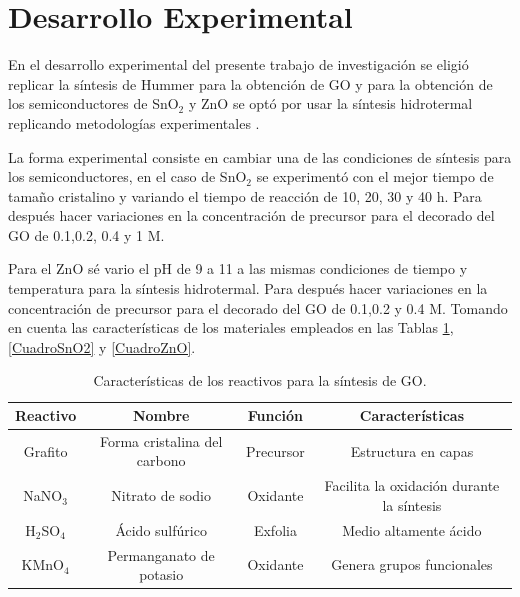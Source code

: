 \documentclass[12pt]{article}
\begin{document}
\newpage
\section{Desarrollo Experimental}
En el desarrollo experimental del presente trabajo de investigación se eligió replicar la síntesis de Hummer para la obtención de GO y para la obtención de los semiconductores de SnO$\displaystyle _{2}$ y ZnO se optó por usar la síntesis hidrotermal replicando metodologías experimentales \cite{IEEEreferencias:Ref36}.\vspace{1em} %

La forma experimental consiste en cambiar una de las condiciones de síntesis para los semiconductores, en el caso de SnO$\displaystyle _{2}$ se experimentó con el mejor tiempo de tamaño cristalino y variando el tiempo de reacción de 10, 20, 30 y 40 h. Para después hacer variaciones en la concentración de precursor para el decorado del GO de 0.1,0.2, 0.4 y 1 M.\vspace{1em} %

Para el ZnO sé vario el pH de 9 a 11 a las mismas condiciones de tiempo y temperatura para la síntesis hidrotermal. Para después hacer variaciones en la concentración de precursor para el decorado del GO de 0.1,0.2 y 0.4 M. Tomando en cuenta las características de los materiales empleados en las Tablas \ref{CuadroGO}, \ref{CuadroSnO2} y \ref{CuadroZnO}.\vspace{1em} %
\begin{table}[h]
\centering
\caption{Características de los reactivos para la síntesis de GO.}
\begin{tabular}{|c|c|c|c|}
\hline
\textbf{Reactivo} & \textbf{Nombre} & \textbf{Función} & \textbf{Características} \\ 
\hline
Grafito 
& Forma cristalina del carbono 
& Precursor 
& Estructura en capas \\ 
\hline
NaNO$_3$ 
& Nitrato de sodio 
& Oxidante 
& Facilita la oxidación durante la síntesis \\ 
\hline
H$_2$SO$_4$ 
& Ácido sulfúrico 
& Exfolia 
& Medio altamente ácido \\ 
\hline
KMnO$_4$ 
& Permanganato de potasio 
& Oxidante 
& Genera grupos funcionales \\ 
\hline
\end{tabular}
\label{CuadroGO}
\end{table}
\end{document}
